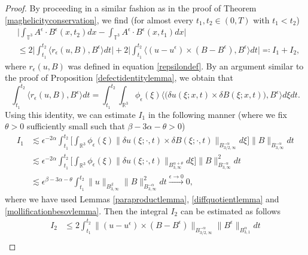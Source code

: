 \documentclass[12pt,a4paper]{article}
\theoremstyle{definition}
\theoremstyle{remark}
\numberwithin{equation}{section}
\begin{document}
\begin{proof}
By proceeding in a similar fashion as in the proof of Theorem \ref{maghelicityconservation}, we find (for almost every $t_1, t_2 \in (0,T)$ with $t_1 < t_2$)
\begin{align*}
&\bigg\lvert \int_{\mathbb{T}^3} A^\epsilon \cdot B^\epsilon (x,t_2) dx - \int_{\mathbb{T}^3} A^\epsilon \cdot B^\epsilon (x,t_1) dx \bigg\rvert \\
&\leq 2 \bigg\lvert \int_{t_1}^{t_2} \big\langle  r_\epsilon (u,B) , B^\epsilon  \rangle dt \bigg\rvert + 2 \bigg\lvert \int_{t_1}^{t_2}\big\langle (u - u^\epsilon) \times (B - B^\epsilon) , B^\epsilon \big\rangle dt \bigg\rvert \eqqcolon I_1 + I_2,
\end{align*}
where $r_\epsilon (u,B)$ was defined in equation \eqref{repsilondef}. By an argument similar to the proof of Proposition \ref{defectidentitylemma}, we obtain that
\begin{equation*}
\int_{t_1}^{t_2} \big\langle  r_\epsilon (u,B) , B^\epsilon  \rangle dt = \int_{t_1}^{t_2} \int_{\mathbb{R}^3} \phi_\epsilon (\xi) \big\langle  \big( \delta u (\xi ; x,t) \times \delta B (\xi ; x,t) \big) , B^\epsilon  \rangle d \xi dt.
\end{equation*}
Using this identity, we can estimate $I_1$ in the following manner (where we fix $\theta > 0$ sufficiently small such that $\beta - 3 \alpha - \theta > 0$)
\begin{align*}
I_1 &\lesssim \epsilon^{-2\alpha} \int_{t_1}^{t_2} \bigg[ \int_{\mathbb{R}^3} \phi_\epsilon (\xi) \lVert \delta u (\xi; \cdot, t) \times \delta B (\xi;\cdot,t) \rVert_{B^{-\alpha}_{3/2,\infty}} d \xi \bigg] \lVert B \rVert_{B^{-\alpha}_{3,\infty}} dt \\
&\lesssim \epsilon^{-2\alpha} \int_{t_1}^{t_2} \bigg[ \int_{\mathbb{R}^3} \phi_\epsilon (\xi) \lVert \delta u (\xi; \cdot, t) \rVert_{B^{\alpha + \theta}_{3,\infty}} d \xi \bigg] \lVert B \rVert_{B^{-\alpha}_{3,\infty}}^2 dt \\
&\lesssim \epsilon^{\beta-3\alpha-\theta} \int_{t_1}^{t_2} \lVert u  \rVert_{B^{\beta}_{3,\infty}} \lVert B \rVert_{B^{-\alpha}_{3,\infty}}^2 dt \xrightarrow[]{\epsilon \rightarrow 0} 0,
\end{align*}
where we have used Lemmas \ref{paraproductlemma}, \ref{diffquotientlemma} and \ref{mollificationbesovlemma}. Then the integral $I_2$ can be estimated as follows 
\begin{align*}
I_2 &\leq 2 \int_{t_1}^{t_2} \lVert (u - u^\epsilon) \times (B - B^\epsilon) \rVert_{B^{-\alpha}_{3/2,\infty}} \lVert B^\epsilon \rVert_{B^\alpha_{3,1}} dt \\

\end{align*}
\end{proof}
\end{document}
